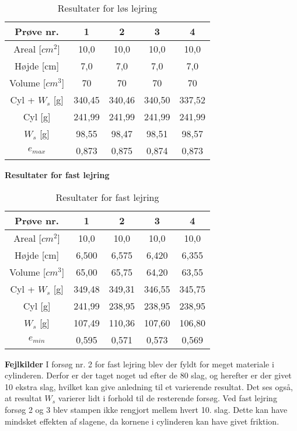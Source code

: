 \begin{table}
\begin{center}
	\begin{tabular}{ |c|c|c|c|c| } 
		\hline
		Prøve nr. & 1 & 2 & 3 & 4 \\	\hline 
		Areal [$cm^2$] & 10,0 & 10,0 & 10,0 & 10,0 \\ \hline
		Højde [cm] & 7,0 & 7,0 & 7,0 & 7,0 \\ \hline
		Volume [$cm^3$] & 70 & 70 & 70 & 70 \\ \hline
		Cyl + $W_s$ [g] & 340,45 & 340,46 & 340,50 & 337,52 \\ \hline
		Cyl [g] & 241,99 & 241,99 & 241,99 & 241,99 \\ \hline
		$W_s$ [g] & 98,55 & 98,47 & 98,51 & 98,57 \\ \hline
		$e_{max}$ & 0,873 & 0,875 & 0,874 & 0,873 \\ \hline
	\end{tabular}
	\caption{Resultater for løs lejring}
	\label{tab:bilagd1}
\end{center}
\end{table}

\textbf{Resultater for fast lejring}
\begin{table}
\begin{center}
	\begin{tabular}{ |c|c|c|c|c| } 
		\hline
		Prøve nr. & 1 & 2 & 3 & 4 \\	\hline 
		Areal [$cm^2$] & 10,0 & 10,0 & 10,0 & 10,0 \\ \hline
		Højde [cm] & 6,500 & 6,575 & 6,420 & 6,355 \\ \hline
		Volume [$cm^3$] & 65,00 & 65,75 & 64,20 & 63,55 \\ \hline
		Cyl + $W_s$ [g] & 349,48 & 349,31 & 346,55 & 345,75 \\ \hline
		Cyl [g] & 241,99 & 238,95 & 238,95 & 238,95 \\ \hline
		$W_s$ [g] & 107,49 & 110,36 & 107,60 & 106,80 \\ \hline
		$e_{min}$ & 0,595 & 0,571 & 0,573 & 0,569 \\ \hline
	\end{tabular}
	\caption{Resultater for fast lejring}
	\label{tab:bilagd2}
\end{center}
\end{table}

\textbf{Fejlkilder}
\newline
I forsøg nr. 2 for fast lejring blev der fyldt for meget materiale i cylinderen. Derfor er der taget noget ud efter de 80 slag, og herefter er der givet 10 ekstra slag, hvilket kan give anledning til et varierende resultat. Det ses også, at resultat $W_s$ varierer lidt i forhold til de resterende forsøg.
\newline \indent{     }  Ved fast lejring forsøg 2 og 3 blev stampen ikke rengjort mellem hvert 10. slag. Dette kan have mindsket effekten af slagene, da kornene i cylinderen kan have givet friktion.